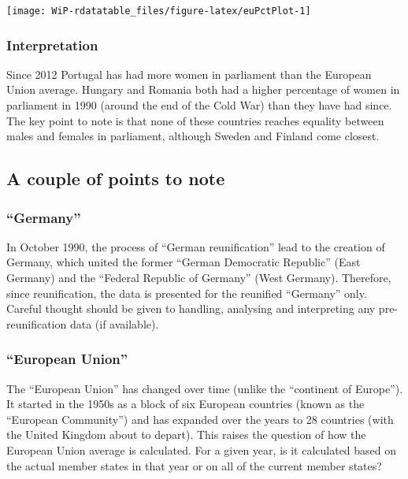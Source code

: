 \documentclass[a4paper,9pt,twocolumn,twoside,printwatermark=false]{pinp}
\begin{document}
\begin{center}\texttt{[image: WiP-rdatatable\_files/figure-latex/euPctPlot-1]} \end{center}

\subsubsection{Interpretation}\label{interpretation-1}

Since 2012 Portugal has had more women in parliament than the European
Union average. Hungary and Romania both had a higher percentage of women
in parliament in 1990 (around the end of the Cold War) than they have
had since. The key point to note is that none of these countries reaches
equality between males and females in parliament, although Sweden and
Finland come closest.

\subsection{A couple of points to
note}\label{a-couple-of-points-to-note}

\subsubsection{\texorpdfstring{``Germany''}{Germany}}\label{germany}

In October 1990, the process of ``German reunification'' lead to the
creation of Germany, which united the former ``German Democratic
Republic'' (East Germany) and the ``Federal Republic of Germany'' (West
Germany). Therefore, since reunification, the data is presented for the
reunified ``Germany'' only. Careful thought should be given to handling,
analysing and interpreting any pre-reunification data (if available).

\subsubsection{\texorpdfstring{``European
Union''}{European Union}}\label{european-union}

The ``European Union'' has changed over time (unlike the ``continent of
Europe''). It started in the 1950s as a block of six European countries
(known as the ``European Community'') and has expanded over the years to
28 countries (with the United Kingdom about to depart). This raises the
question of how the European Union average is calculated. For a given
year, is it calculated based on the actual member states in that year or
on all of the current member states?
\end{document}
